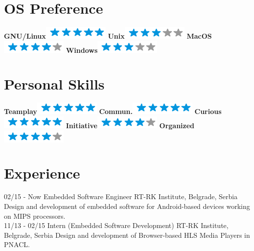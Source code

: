\documentclass[]{rankovic-cv}
\begin{document}
\begin{aside}
  \section{OS Preference}
    \textbf{GNU/Linux}\includegraphics[scale=0.40]{img/5stars.png}
    \textbf{Unix}\includegraphics[scale=0.40]{img/3stars.png}
    \textbf{MacOS}\includegraphics[scale=0.40]{img/4stars.png}
    \textbf{Windows}\includegraphics[scale=0.40]{img/3stars.png}
    ~
  \section{Personal Skills}
    \textbf{Teamplay}\includegraphics[scale=0.40]{img/5stars.png}
    \textbf{Commun.}\includegraphics[scale=0.40]{img/5stars.png}
    \textbf{Curious}\includegraphics[scale=0.40]{img/5stars.png}
    \textbf{Initiative}\includegraphics[scale=0.40]{img/4stars.png}
    \textbf{Organized}\includegraphics[scale=0.40]{img/4stars.png}
    ~
\end{aside}

\section{Experience}
\begin{entrylist}
  \entry
    {02/15 - Now}
    {Embedded Software Engineer}
    {RT-RK Institute, Belgrade, Serbia}
    {Design and development of embedded software     for Android-based devices working on MIPS processors.\\}
  \entry
    {11/13 - 02/15}
    {Intern (Embedded Software Development)}
    {RT-RK Institute, Belgrade, Serbia}
    {Design and development of Browser-based HLS Media Players in PNACL.\\}
\end{entrylist}
~
\end{document}

